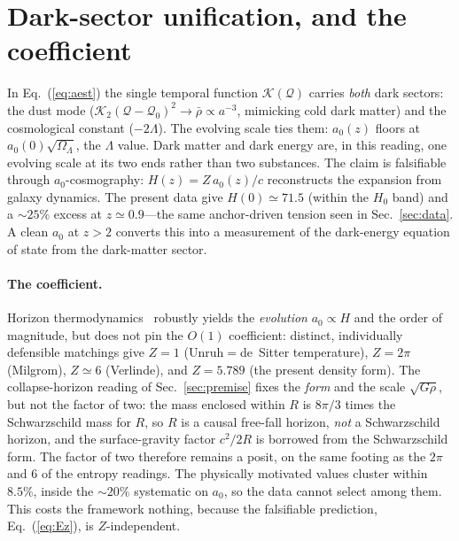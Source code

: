 \documentclass[aps,prd,preprint,nofootinbib,floatfix]{revtex4-2}
\begin{document}
\section{Dark-sector unification, and the coefficient}
\label{sec:bridge3}
In Eq.~(\ref{eq:aest}) the single temporal function $\mathcal{K}(\mathcal{Q})$
carries {\it both} dark sectors: the dust mode
($\mathcal{K}_2(\mathcal{Q}-\mathcal{Q}_0)^2\to\bar\rho\propto a^{-3}$, mimicking
cold dark matter) and the cosmological constant ($-2\Lambda$). The evolving scale
ties them: $a_0(z)$ floors at $a_0(0)\sqrt{\Omega_\Lambda}$, the $\Lambda$ value.
Dark matter and dark energy are, in this reading, one evolving scale at its two
ends rather than two substances. The claim is falsifiable through
$a_0$-cosmography: $H(z)=Z\,a_0(z)/c$ reconstructs the expansion from galaxy
dynamics. The present data give $H(0)\simeq71.5$ (within the $H_0$ band) and a
$\sim25\%$ excess at $z\simeq0.9$---the same anchor-driven tension seen in
Sec.~\ref{sec:data}. A clean $a_0$ at $z>2$ converts this into a measurement of
the dark-energy equation of state from the dark-matter sector.

\paragraph*{The coefficient.}\label{sec:coeff}
Horizon thermodynamics~\cite{Jacobson1995,Verlinde2017} robustly yields the
{\it evolution} $a_0\propto H$ and the order of magnitude, but does not pin the
$O(1)$ coefficient: distinct, individually defensible matchings give $Z=1$
(Unruh${=}$de~Sitter temperature), $Z=2\pi$ (Milgrom), $Z\simeq6$ (Verlinde), and
$Z=5.789$ (the present density form). The collapse-horizon reading of
Sec.~\ref{sec:premise} fixes the {\it form} and the scale $\sqrt{G\rho}$, but not
the factor of two: the mass enclosed within $R$ is $8\pi/3$ times the Schwarzschild
mass for $R$, so $R$ is a causal free-fall horizon, {\it not} a Schwarzschild
horizon, and the surface-gravity factor $c^2/2R$ is borrowed from the Schwarzschild
form. The factor of two therefore remains a posit, on the same footing as the
$2\pi$ and $6$ of the entropy readings. The physically motivated values cluster
within $8.5\%$, inside the $\sim20\%$ systematic on $a_0$, so the data cannot
select among them. This costs
the framework nothing, because the falsifiable prediction, Eq.~(\ref{eq:Ez}), is
$Z$-independent.

\end{document}
